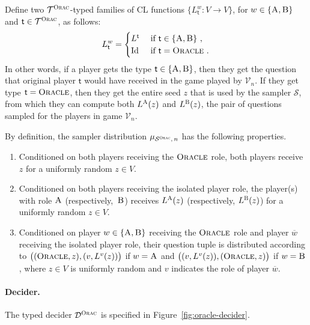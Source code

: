 \documentclass[11pt]{article}
\theoremstyle{definition}
\newcommand{\sampler}{\mathcal{S}}
\newcommand{\decider}{\mathcal{D}}
\newcommand{\verifier}{\mathcal{V}}
\newcommand{\type}{\mathcal{T}}
\newcommand{\gamestyle}[1]{\ensuremath{\textsc{#1}}\xspace}
\newcommand{\ora}{\gamestyle{Orac}}
\newcommand{\labelstyle}[1]{\ensuremath{\textsc{#1}}\xspace}
\newcommand{\tvarstyle}[1]{\mathsf{#1}}
\newcommand{\tvar}{\ensuremath{\tvarstyle{t}}}
\newcommand{\alice}{\labelstyle{A}}
\newcommand{\bob}{\labelstyle{B}}
\newcommand{\oracle}{\labelstyle{Oracle}}
\begin{document}
Define two $\type^\ora$-typed families of CL functions $\{ L^{w}_\tvar: V \to V
\}$, for $w \in \{\alice,\bob\}$ and $\tvar \in \type^\ora$, as follows:
\begin{equation*}
	L^{w}_\tvar =
  \begin{cases}
		L^\tvar & \text { if $\tvar \in \{\alice,\bob\}$ }, \\
		\mathrm{Id} & \text { if $\tvar = \oracle$ }.
	\end{cases}
\end{equation*}
In other words, if a player gets the type $\tvar \in \{\alice,\bob\}$, then they
get the question that original player $\tvar$ would have received in the game
played by $\verifier_n$.
If they get type $\tvar = \oracle$, then they get the entire seed $z$ that is
used by the sampler $\sampler$, from which they can compute both $L^\alice(z)$
and $L^\bob(z)$, the pair of questions sampled for the players in game
$\verifier_n$.


By definition, the sampler distribution $\mu_{\sampler^\ora,\, n}$ has the
following properties.
\begin{enumerate}
\item Conditioned on both players receiving the $\oracle$ role, both players
  receive $z$ for a uniformly random $z \in V$.
		
\item Conditioned on both players receiving the isolated player role, the
  player(s) with role $\alice$ (respectively,~$\bob$) receives $L^\alice(z)$
  (respectively, $L^\bob(z)$) for a uniformly random $z \in V$.
		
\item Conditioned on player $w\in\{\alice,\bob\}$ receiving the $\oracle$ role
  and player $\overline{w}$ receiving the isolated player role, their question
  tuple is distributed according to $\bigl( (\oracle,z), (v,L^v(z)) \bigr)$ if
  $w=\alice$ and $\bigl( (v, L^v(z)), (\oracle,z) \bigr)$ if $w=\bob$, where $z
  \in V$ is uniformly random and $v$ indicates the role of player
  $\overline{w}$.
\end{enumerate}

\paragraph{Decider.}
The typed decider $\decider^\ora$ is specified in Figure~\ref{fig:oracle-decider}.
\end{document}
